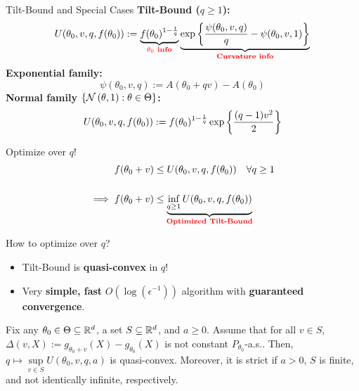 \begin{frame}{Tilt-Bound and Special Cases}
\textbf{Tilt-Bound ($q \geq 1$):}
\begin{equation*}
    U(\theta_0, v, q, f(\theta_0))
    :=
    \underbrace{f(\theta_0)^{1 - \frac{1}{q}}}_{
    \mathclap{\textcolor{red}{\theta_0 \textbf{ info}}}
    }
    \underbrace{\exp\sbr{\frac{\psi(\theta_0, v, q)}{q} - \psi(\theta_0, v, 1)}}_{
    \mathclap{\textcolor{red}{\textbf{Curvature info}}}
    }
\end{equation*}
\textbf{Exponential family:}
\begin{equation*}
    \psi(\theta_0, v, q) 
    :=
    A(\theta_0 + qv) - A(\theta_0)
\end{equation*}
\textbf{Normal family $\{\mathcal{N}\left( \theta, 1 \right) : \theta \in \Theta\}$:}
\begin{equation*}
    U(\theta_0, v, q, f(\theta_0))
    :=
    f(\theta_0)^{1 - \frac{1}{q}} 
    \exp\left\{\frac{(q - 1) v^2}{2}\right\}
\end{equation*}
\end{frame}

\begin{frame}{Optimize over $q$!}
\begin{align*}
    f(\theta_0 + v) 
    &\leq 
    U(\theta_0, v, q, f(\theta_0))
    \quad \forall q \geq 1
    \\\\ \implies
    f(\theta_0 + v)
    &\leq
    \underbrace{%
    \inf\limits_{q \geq 1}
    U(\theta_0, v, q, f(\theta_0))}_{
    \mathclap{\textcolor{red}{\textbf{Optimized Tilt-Bound}}}
    }
\end{align*}  
\end{frame}

\begin{frame}{How to optimize over $q$?}
\begin{itemize}
    \item Tilt-Bound is \textbf{quasi-convex} in $q$!
    \item Very \textbf{simple, fast} 
        $O(\log(\epsilon^{-1}))$ algorithm
        with \textbf{guaranteed convergence}.
\end{itemize}    
\begin{theorem}
Fix any $\theta_0 \in \Theta \subseteq \mathbb{R}^d$,
a set $S \subseteq \mathbb{R}^d$,
and $a \geq 0$.
Assume that for all $v \in S$,
$\Delta(v, X) := g_{\theta_0 + v}(X) - g_{\theta_0}(X)$
is not constant $P_{\theta_0}$-a.s..
Then, $q \mapsto \sup\limits_{v \in S} U(\theta_0, v, q, a)$ 
is quasi-convex.
Moreover, it is strict if $a > 0$, $S$ is finite, 
and not identically infinite, respectively.
\end{theorem}
\end{frame}

